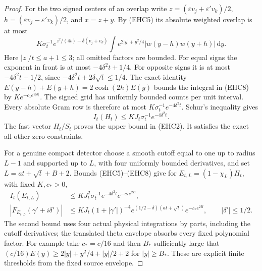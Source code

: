 \documentclass[11pt]{article}
\theoremstyle{remark}\newtheorem{remark}[theorem]{Remark}
\newcommand{\dd}{\,\mathrm d}
\begin{document}
\begin{proof}
For the two signed centers of an overlap write
$z=(\varepsilon v_j+\varepsilon'v_k)/2$,
$h=(\varepsilon v_j-\varepsilon'v_k)/2$, and $x=z+y$.
By (EHC5) its absolute weighted overlap is at most
\[
 K\sigma_t^{-1}e^{z^2/(4t)-\delta(v_j+v_k)}
   \int e^{2|y|+y^2/4}|w(y-h)w(y+h)|\dd y.        \tag{EHC8}
\]
Here $|z|/t\le a+1\le3$; all omitted factors are bounded.
For equal signs the exponent in front is at most
$-4\delta^2t+1/4$. For opposite signs it is at most
$-4\delta^2t+1/2$, since
$-4\delta^2t+2\delta\sqrt t\le1/4$.
The exact identity
$E(y-h)+E(y+h)=2\cosh(2h)E(y)$ bounds the integral
in (EHC8) by $K e^{-c_1e^{2|h|}}$.
The signed grid has uniformly bounded counts per unit interval.
Every absolute Gram row is therefore at most
$K\sigma_t^{-1}e^{-4\delta^2t}$.
Schur's inequality gives
\[
 I_t(H_t)\le KJ_t\sigma_t^{-1}e^{-4\delta^2t}.       \tag{EHC9}
\]
The fast vector $H_t/S_t$ proves the upper bound in (EHC2).
It satisfies the exact all-other-zero constraints.

For a genuine compact detector choose a smooth cutoff equal
to one up to radius $L-1$ and supported up to $L$, with
four uniformly bounded derivatives, and set
$L=at+\sqrt t+B+2$. Bounds (EHC5)--(EHC8) give
for $E_{t,L}=(1-\chi_L)H_t$, with fixed $K,c_*>0$,
\[
 \begin{split}
 I_t(E_{t,L})&\le KJ_t^2\sigma_t^{-1}e^{-4\delta^2t}
                                             e^{-c_*e^{2B}},\\
 |F_{E_{t,L}}(\gamma'+i\delta')|
 &\le KJ_t(1+|\gamma'|)^{-4}
       e^{(1/2-\delta)(at+\sqrt t)}e^{-c_*e^{2B}},
                         \qquad|\delta'|\le1/2.
 \end{split}                                      \tag{EHC10}
\]
The second bound uses four actual physical integrations
by parts, including the cutoff derivatives; the translated
theta envelope absorbs every fixed polynomial factor.
For example take $c_*=c/16$ and then $B_*$ sufficiently
large that
$(c/16)E(y)\ge2|y|+y^2/4+|y|/2+2$ for $|y|\ge B_*$.
These are explicit finite thresholds from the fixed
source envelope.


\end{proof}
\end{document}
